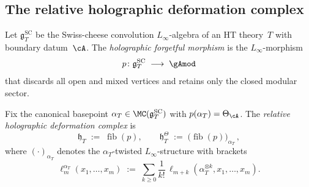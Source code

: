 \subsection{The relative holographic deformation complex}%
\label{subsec:relative-holographic-deformation}%
%

\begin{definition}%
\label{def:holographic-forgetful}%
%
Let $\mathfrak{g}_T^{\mathrm{SC}}$ be the Swiss-cheese
convolution $L_\infty$-algebra of an HT theory~$T$
with boundary datum~$\cA$. The \emph{holographic
forgetful morphism} is the $L_\infty$-morphism
\begin{equation}\label{eq:holographic-forgetful}
p\colon \mathfrak{g}_T^{\mathrm{SC}}
\;\longrightarrow\;
\gAmod
\end{equation}
that discards all open and mixed vertices and retains
only the closed modular sector.
\end{definition}

\begin{definition}%
\label{def:relative-holographic-deformation}%
%
Fix the canonical basepoint
$\alpha_T \in \MC(\mathfrak{g}_T^{\mathrm{SC}})$
with $p(\alpha_T) = \Theta_\cA$.
The \emph{relative holographic deformation complex} is
\begin{equation}\label{eq:relative-fiber}
\mathfrak{h}_T
\;:=\;
\operatorname{fib}(p),
\qquad
\mathfrak{h}_T^\Theta
\;:=\;
\bigl(\operatorname{fib}(p)\bigr)_{\alpha_T}\,,
\end{equation}
where $(\cdot)_{\alpha_T}$ denotes the
$\alpha_T$-twisted $L_\infty$-structure with
brackets
\begin{equation}\label{eq:twisted-brackets}
\ell_m^{\alpha_T}(x_1,\ldots,x_m)
\;:=\;
\sum_{k \geq 0}\frac{1}{k!}\,
\ell_{m+k}(\alpha_T^{\otimes k},x_1,\ldots,x_m).
\end{equation}
\end{definition}


